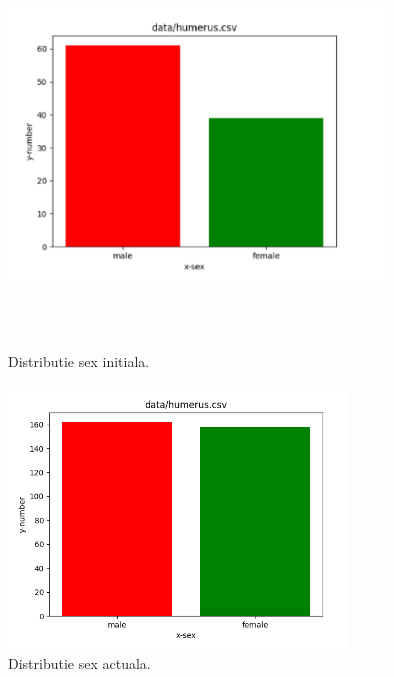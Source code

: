 \documentclass[runningheads,a4paper,11pt]{report}
\begin{document}
\begin{figure}[!h]
  \centering
  \begin{minipage}[b]{0.4\textwidth}
    \includegraphics[width=10cm,height=10cm]{Imagini/plot_init_sex.PNG}
    \caption{Distributie sex initiala.}
  \end{minipage}
  \hfill
  \begin{minipage}[b]{0.4\textwidth}
    \includegraphics[width=9cm]{Imagini/plot_humerus_sex.png}
    \caption{Distributie sex actuala.}
  \end{minipage}
\end{figure}
\end{document}
